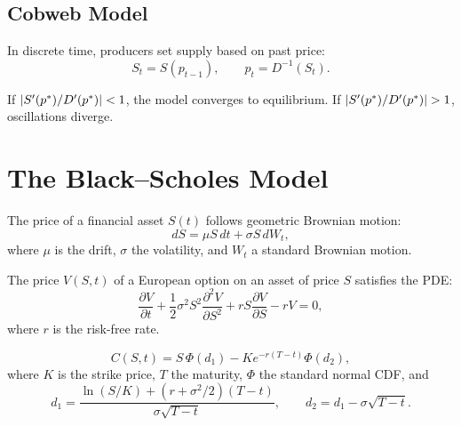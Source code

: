 \subsection{Cobweb Model}

\begin{definition}
In discrete time, producers set supply based on past price:
\[
  S_t = S(p_{t-1}), \qquad p_t = D^{-1}(S_t).
\]
\end{definition}

\begin{proposition}
If $\left| S'(p^*)/D'(p^*) \right| < 1$, the model converges to equilibrium.
If $\left| S'(p^*)/D'(p^*) \right| > 1$, oscillations diverge.
\end{proposition}

\section{The Black--Scholes Model}
\label{sec:black_scholes}

\begin{definition}
The price of a financial asset $S(t)$ follows geometric Brownian
motion:
\[
  dS = \mu S\,dt + \sigma S\,dW_t,
\]
where $\mu$ is the drift, $\sigma$ the volatility, and $W_t$ a
standard Brownian motion.
\end{definition}

\begin{theorem}
The price $V(S,t)$ of a European option on an asset of price $S$
satisfies the PDE:
\[
  \frac{\partial V}{\partial t}
  + \frac{1}{2}\sigma^2 S^2\frac{\partial^2 V}{\partial S^2}
  + rS\frac{\partial V}{\partial S} - rV = 0,
\]
where $r$ is the risk-free rate.
\end{theorem}

\begin{keyformulas}[title=\textbf{Black--Scholes formula for a European call}]
\[
  C(S,t) = S\,\Phi(d_1) - Ke^{-r(T-t)}\Phi(d_2),
\]
where $K$ is the strike price, $T$ the maturity, $\Phi$ the standard
normal CDF, and
\[
  d_1 = \frac{\ln(S/K)+(r+\sigma^2/2)(T-t)}{\sigma\sqrt{T-t}},
  \qquad d_2 = d_1 - \sigma\sqrt{T-t}.
\]
\end{keyformulas}

